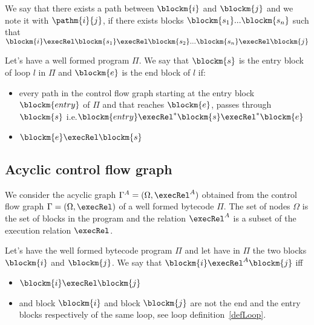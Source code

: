 We say that there exists a path between $\blockm{i}$ and $\blockm{j}$ and we note it with  $\pathm{i}{j}$, if there exists blocks 
$\blockm{s_{1}}... \blockm{s_{n}}$ such that $\blockm{i} \execRel \blockm{s_{1}} \execRel \blockm{s_{2}}... \blockm{s_{n}} \execRel  \blockm{j}$
\begin{defn}
\label{defLoop}
Let's have a well formed program $\Pi$. We say that $\blockm{s}$ is the entry block of loop $l$ in $\Pi$ and $\blockm{e}$ is the end block of $l$ if:
\begin{itemize}
\item every path in the control flow graph starting at the entry block $\blockm{entry}$ of $\Pi$ and that reaches $\blockm{e}$, passes through  $\blockm{s}$ 
  i.e.$ \blockm{entry} \execRel^{*}  \blockm{s} \execRel^{*} \blockm{e}$
\item $\blockm{e} \execRel \blockm{s}$
\end{itemize}
\end{defn}


\subsection{Acyclic control flow graph} \label{graph}
We consider the acyclic graph $\Gamma^A = ( \Omega, \execRel^A)$ obtained from the control flow graph 
$\Gamma  = ( \Omega, \execRel)$ of a well formed bytecode $ \Pi $. The set of nodes $\Omega$ is the set of  blocks in the 
program and the relation  $\execRel^A$ is a subset of the  execution relation $\execRel$.
\begin{defn}
\label{acyclicExRel}
Let's have the well formed bytecode program $\Pi$ and let have in $\Pi$ the two blocks  $\blockm{i} $ and   $\blockm{j}$. We say 
that $\blockm{i} \execRel^A \blockm{j}$ iff
\begin{itemize}
\item $\blockm{i} \execRel \blockm{j}$
\item and block $\blockm{i}$ and block $\blockm{j}$ are not the end and the entry blocks respectively of the same loop, see loop definition~\ref{defLoop}.
\end{itemize}
\end{defn}



